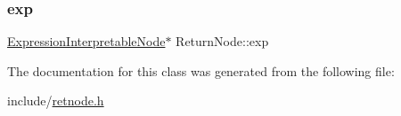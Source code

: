 \subsubsection{\texorpdfstring{exp}{exp}}
{\footnotesize\ttfamily \hyperlink{classExpressionInterpretableNode}{Expression\+Interpretable\+Node}$\ast$ Return\+Node\+::exp}



The documentation for this class was generated from the following file\+:\begin{DoxyCompactItemize}
\item 
include/\hyperlink{retnode_8h}{retnode.\+h}\end{DoxyCompactItemize}
